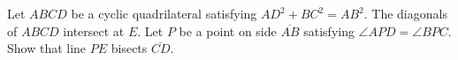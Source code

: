 Let $ABCD$ be a cyclic quadrilateral satisfying $AD^2+BC^2=AB^2$. The diagonals of $ABCD$ intersect at $E$. Let $P$ be a point on side $\overline{AB}$ satisfying $\angle{APD}=\angle{BPC}$. Show that line $PE$ bisects $\overline{CD}$.